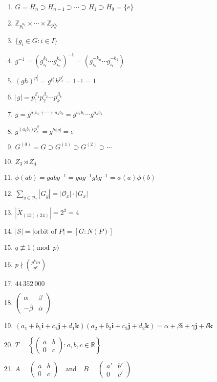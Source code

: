 \documentclass[oneside,10pt,]{article}
\begin{document}
\begin{enumerate}
\item{}\(G = H_n \supset H_{n - 1} \supset \cdots \supset H_1 \supset H_0 = \{ e \}\)%
\item{}\({\mathbb Z}_{p_1^{\alpha_1}} \times \cdots \times {\mathbb Z}_{p_n^{\alpha_n}}\)%
\item{}\(\{ g_i \in G : i \in I \}\)%
\item{}\(g^{-1} = (g_{i_1}^{k_{1}} \cdots g_{i_n}^{k_n})^{-1} = (g_{i_n}^{-k_n} \cdots g_{i_{1}}^{-k_{1}})\)%
\item{}\((gh)^{p_i^t} = g^{p_i^t} h^{p_i^t} = 1 \cdot 1 = 1\)%
\item{}\(|g| = p_1^{\beta_1} p_2^{\beta_2} \cdots p_k^{\beta_k}\)%
\item{}\(g = g^{a_1 b_1 + \cdots + a_k b_k} = g^{a_1 b_1} \cdots g^{a_k b_k}\)%
\item{}\(g^{(a_i b_i ) p_i^{\beta_i}} = g^{b_i |g|} = e\)%
\item{}\(G^{(0)} = G \supset G^{(1)} \supset G^{(2)} \supset \cdots\)%
\item{}\(Z_3\rtimes Z_4\)%
\item{}\(\phi(ab) = gabg^{-1} = gag^{-1} gbg^{-1} = \phi(a) \phi(b)\)%
\item{}\(\sum_{y \in {\mathcal O}_x} |G_y| = | {\mathcal O}_x| \cdot |G_x|\)%
\item{}\(|\widetilde{X}_{(13)(24)}| = 2^2 = 4\)%
\item{}\(|{\mathcal S}| = |\text{orbit of }P| = [G : N(P)]\)%
\item{}\(q \not\equiv 1 \pmod{p}\)%
\item{}\(p \nmid \binom{p^k m}{p^k}\)%
\item{}\(44\,352\,000\)%
\item{}\(\begin{pmatrix} \alpha & \beta \\ -\overline{\beta} & \overline{\alpha } \end{pmatrix}\)%
\item{}\((a_1 + b_1 {\mathbf i} + c_1 {\mathbf j} +d_1 {\mathbf k} ) ( a_2 + b_2 {\mathbf i} + c_2 {\mathbf j} +d_2 {\mathbf k} ) = \alpha + \beta {\mathbf i} + \gamma {\mathbf j} + \delta {\mathbf k}\)%
\item{}\(T = \left\{ \begin{pmatrix} a & b \\ 0 & c \end{pmatrix} : a, b, c \in {\mathbb R} \right\}\)%
\item{}\(A = \begin{pmatrix} a & b \\ 0 & c \end{pmatrix} \quad \text{and} \quad B = \begin{pmatrix} a' & b' \\ 0 & c' \end{pmatrix}\)%

\end{enumerate}
\end{document}
